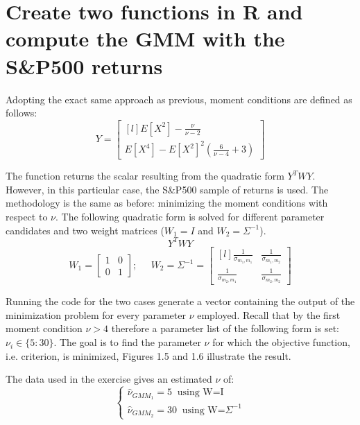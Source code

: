 \newpage
\section{Create two functions in R and compute the GMM with the S\&P500 returns}

Adopting the exact same approach as previous, moment conditions are defined as follows:
\begin{equation*}
    Y=    
    \begin{bmatrix}[l]
    E[X^2]-\frac{\nu}{\nu-2} \\
    E[X^4]-E[X^2]^2(\frac{6}{\nu-4}+3)
    \end{bmatrix}
\end{equation*}

The function returns the scalar resulting from the quadratic form $Y^TWY$. However, in this particular case, the S\&P500 sample of returns is used. The methodology is the same as before: minimizing the moment conditions with respect to $\nu$. The following quadratic form is solved for different parameter candidates and two weight matrices ($W_1=I$ and $W_2=\Sigma^{-1}$).
\begin{equation*}
    Y^TWY
\end{equation*}
\begin{equation*}
    W_1=
    \begin{bmatrix}
        1   &0 \\
        0   &1
    \end{bmatrix};\;\;\;\;\;
    W_2=\Sigma^{-1}=
    \begin{bmatrix}[l]
        \frac{1}{\sigma_{m_1,m_1}}    &\frac{1}{\sigma_{m_1,m_2}} \\
        \frac{1}{\sigma_{m_2,m_1}}    &\frac{1}{\sigma_{m_2,m_2}}
    \end{bmatrix}
\end{equation*}

Running the code for the two cases generate a vector containing the output of the minimization problem for every parameter $\nu$ employed. Recall that by the first moment condition $\nu>4$ therefore a parameter list of the following form is set: $\nu_i \in \{5:30\}$. The goal is to find the parameter $\nu$ for which the objective function, i.e. criterion, is minimized, Figures 1.5 and 1.6 illustrate the result.
\bigskip\par
The data used in the exercise gives an estimated $\nu$ of:
\begin{equation*}
    \begin{cases}
    \widehat{\nu}_{GMM_{1}}=5 \;\;\text{using W=I}\\
    \widehat{\nu}_{GMM_{2}}=30 \;\;\text{using W=}\Sigma^{-1}
\end{cases}
\end{equation*}



